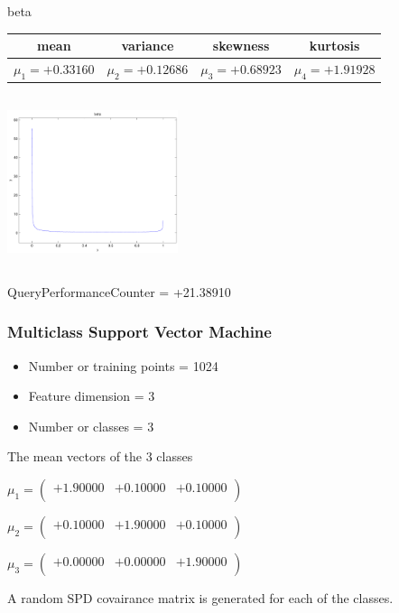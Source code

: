 \documentclass[9pt]{article}
\theoremstyle{plain}
\theoremstyle{definition}
\theoremstyle{remark}
\numberwithin{equation}{section}
\begin{document}
\newpage
beta \begin{tabular}{|c|c|c|c|}  mean & variance & skewness & kurtosis \\  \hline
$\mu_1 = +0.33160$ & $\mu_2 = +0.12686$ & $\mu_3 = +0.68923$ & $\mu_4 =+1.91928$ \\
\end{tabular}

\includegraphics[width=5cm,height=5cm]{beta.pdf}

QueryPerformanceCounter  =  +21.38910
\subsubsection{Multiclass Support Vector Machine }
\begin{itemize}
\item Number or training points = 1024
\item Feature dimension = 3
\item Number or classes = 3
\end{itemize}
{The mean vectors of the 3 classes}

$\mu_1 = \left(
\begin{array}{
ccc}
+1.90000 & +0.10000 & +0.10000 \\
\end{array}
\right)$ \newline 

$\mu_2 = \left(
\begin{array}{
ccc}
+0.10000 & +1.90000 & +0.10000 \\
\end{array}
\right)$ \newline 

$\mu_3 = \left(
\begin{array}{
ccc}
+0.00000 & +0.00000 & +1.90000 \\
\end{array}
\right)$ \newline 

A random SPD covairance matrix is generated for each of the classes.\newline
\end{document}
